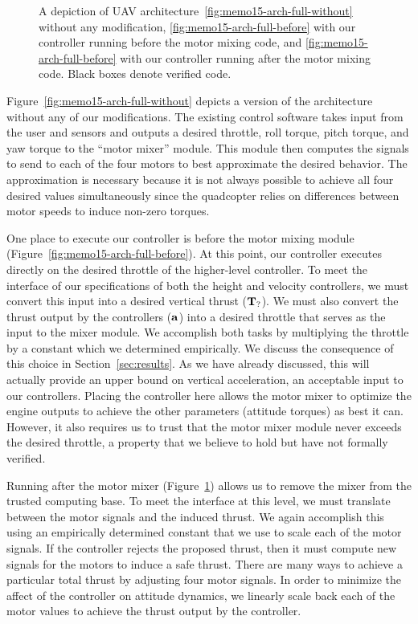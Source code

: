 \begin{figure}[t]
\begin{subfigure}[t]{.3\linewidth}
\begin{tikzpicture}
  \end{tikzpicture}
  \caption{}
  \label{fig:memo15-arch-full-after}
\end{subfigure}

\caption{A depiction of UAV architecture~\ref{fig:memo15-arch-full-without}
  without any modification, \ref{fig:memo15-arch-full-before} with our
  controller running before the motor mixing code, and
  \ref{fig:memo15-arch-full-before} with our controller running after the
  motor mixing code. Black boxes denote verified code.}
\label{fig:arch}
\end{figure}

Figure~\ref{fig:memo15-arch-full-without} depicts a version of the
\ardupilot{} architecture without any of our modifications.  The existing
control software takes input from the user and sensors and outputs a
desired throttle, roll torque, pitch torque, and yaw torque to the ``motor
mixer'' module.  This module then computes the signals to send to each of
the four motors to best approximate the desired behavior.  The
approximation is necessary because it is not always possible to achieve all
four desired values simultaneously since the quadcopter relies on
differences between motor speeds to induce non-zero torques.

One place to execute our controller is before the motor mixing module
(Figure~\ref{fig:memo15-arch-full-before}).  At this point, our controller
executes directly on the desired throttle of the higher-level controller.
To meet the interface of our specifications of both the height and velocity
controllers, we must convert this input into a desired vertical thrust
($\Tproposed$).  We must also convert the thrust output by the controllers ($\T$)
into a desired throttle that serves as the input to the mixer module.  We
accomplish both tasks by multiplying the throttle by a constant which we
determined empirically.  We discuss the consequence of this choice in
Section~\ref{sec:results}. As we have already discussed, this will actually
provide an upper bound on vertical acceleration, an acceptable input to our
controllers.  Placing the controller here allows the motor mixer to optimize the engine
outputs to achieve the other parameters (attitude torques) as best it can.
However, it also requires us to trust that the motor mixer module never
exceeds the desired throttle, a property that we believe to hold but have
not formally verified.

Running after the motor mixer (Figure~\ref{fig:memo15-arch-full-after})
allows us to remove the mixer from the trusted computing base.  To meet the
interface at this level, we must translate between the motor signals and
the induced thrust.  We again accomplish this using an empirically
determined constant that we use to scale each of the motor signals.  If the
controller rejects the proposed thrust, then it must compute new signals
for the motors to induce a safe thrust.  There are many ways to achieve a
particular total thrust by adjusting four motor signals.  In order to
minimize the affect of the controller on attitude dynamics, we linearly
scale back each of the motor values to achieve the thrust output by the
controller.

